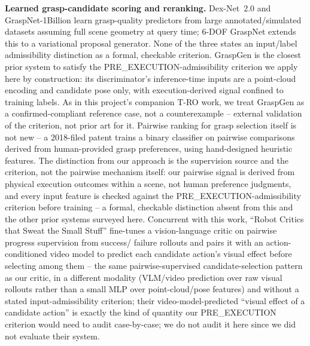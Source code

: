\documentclass[journal]{IEEEtran}
\begin{document}
\textbf{Learned grasp-candidate scoring and reranking.} Dex-Net~2.0
\cite{mahler2017dexnet} and GraspNet-1Billion \cite{graspnet1b2020} learn
grasp-quality predictors from large annotated/simulated datasets assuming
full scene geometry at query time; 6-DOF GraspNet
\cite{mousavian2019sixdof} extends this to a variational proposal
generator. None of the three states an input/label admissibility
distinction as a formal, checkable criterion. GraspGen \cite{graspgen2025}
is the closest prior system to satisfy the PRE\_EXECUTION-admissibility
criterion we apply here by construction: its discriminator's inference-time
inputs are a point-cloud encoding and candidate pose only, with
execution-derived signal confined to training labels. As in this project's
companion T-RO work, we treat GraspGen as a confirmed-compliant reference
case, not a counterexample -- external validation of the criterion, not
prior art for it. Pairwise ranking for grasp selection itself is not new --
a 2018-filed patent \cite{toris2021pairwisegrasp} trains a binary classifier
on pairwise comparisons derived from human-provided grasp preferences,
using hand-designed heuristic features. The distinction from our approach
is the supervision source and the criterion, not the pairwise mechanism
itself: our pairwise signal is derived from physical execution outcomes
within a scene, not human preference judgments, and every input feature is
checked against the PRE\_EXECUTION-admissibility criterion before training
-- a formal, checkable distinction absent from this and the other prior
systems surveyed here. Concurrent with this work, ``Robot Critics that
Sweat the Small Stuff'' \cite{sweatsmallstuff2026} fine-tunes a
vision-language critic on pairwise progress supervision from success/
failure rollouts and pairs it with an action-conditioned video model to
predict each candidate action's visual effect before selecting among them
-- the same pairwise-supervised candidate-selection pattern as our critic,
in a different modality (VLM/video prediction over raw visual rollouts
rather than a small MLP over point-cloud/pose features) and without a
stated input-admissibility criterion; their video-model-predicted
``visual effect of a candidate action'' is exactly the kind of quantity
our PRE\_EXECUTION criterion would need to audit case-by-case; we do not
audit it here since we did not evaluate their system.
\end{document}

